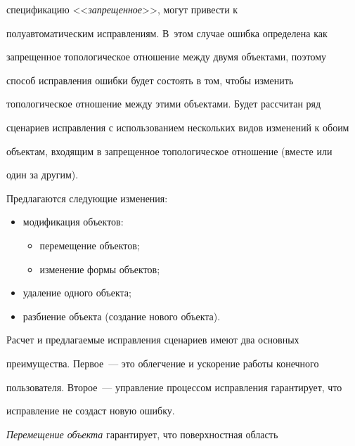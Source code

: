 спецификацию <<\textit{запрещенное}>>, могут привести к 


полуавтоматическим исправлениям. В~этом случае ошибка определена как 


запрещенное топологическое отношение между двумя объектами, поэтому 


способ исправления ошибки будет состоять в том, чтобы изменить 


топологическое отношение между этими объектами. Будет рассчитан ряд 


сценариев исправления с использованием нескольких видов изменений к обоим 


объектам, входящим в запрещенное топологическое отношение (вместе или 


один за другим). 





Предлагаются следующие изменения: 


    \begin{itemize}


\item модификация объектов: 


\begin{itemize}


\item перемещение объектов; 


\item изменение формы объектов; 


\end{itemize}


\item удаление одного объекта; 


\item разбиение объекта (создание нового объекта). 


\end{itemize}


    


    Расчет и предлагаемые исправления сценариев имеют два основных 


преимущества. Первое~--- это облегчение и ускорение работы конечного 


пользователя. Второе~--- управление процессом исправления гарантирует, что  


исправление не создаст новую ошибку. 


    


    \textit{Перемещение объекта} гарантирует, что поверхностная область 


